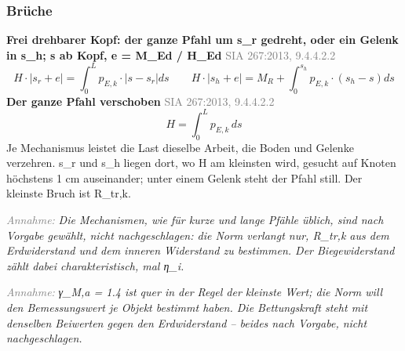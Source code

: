\documentclass[11pt,a4paper]{article}
\newcommand{\normref}[1]{{\small\textcolor{gray}{#1}}}
\newcommand{\hinweis}[2]{\par\noindent\textcolor{gray}{\textit{#1:}} \textit{#2}\par}
\begin{document}
\subsubsection{Brüche}
\noindent\textbf{Frei drehbarer Kopf: der ganze Pfahl um s\_r gedreht, oder ein Gelenk in s\_h; s ab Kopf, e = M\_Ed / H\_Ed} \hfill \normref{SIA 267:2013, 9.4.4.2.2}
\begin{equation*}
H \cdot \left|s_r + e\right| = \int_0^L p_{E,k} \cdot \left|s - s_r\right| ds \qquad H \cdot \left|s_h + e\right| = M_R + \int_0^{s_h} p_{E,k} \cdot \left(s_h - s\right) ds
\end{equation*}
\noindent\textbf{Der ganze Pfahl verschoben} \hfill \normref{SIA 267:2013, 9.4.4.2.2}
\begin{equation*}
H = \int_0^L p_{E,k}\, ds
\end{equation*}
Je Mechanismus leistet die Last dieselbe Arbeit, die Boden und Gelenke verzehren. s\_r und s\_h liegen dort, wo H am kleinsten wird, gesucht auf Knoten höchstens 1 cm auseinander; unter einem Gelenk steht der Pfahl still. Der kleinste Bruch ist R\_tr,k.

\hinweis{Annahme}{Die Mechanismen, wie für kurze und lange Pfähle üblich, sind nach Vorgabe gewählt, nicht nachgeschlagen: die Norm verlangt nur, R\_tr,k aus dem Erdwiderstand und dem inneren Widerstand zu bestimmen. Der Biegewiderstand zählt dabei charakteristisch, mal η\_i.}
\hinweis{Annahme}{γ\_M,a = 1.4 ist quer in der Regel der kleinste Wert; die Norm will den Bemessungswert je Objekt bestimmt haben. Die Bettungskraft steht mit denselben Beiwerten gegen den Erdwiderstand -- beides nach Vorgabe, nicht nachgeschlagen.}
\end{document}
